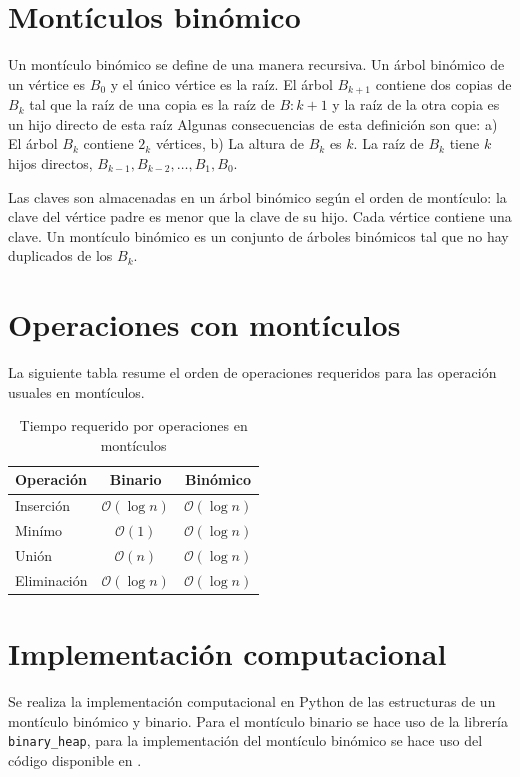 \documentclass[letterpaper,11pt]{article}
\begin{document}
\section{Montículos binómico}

Un montículo binómico se define de una manera recursiva. Un árbol binómico de un vértice es $B_0$ y el único vértice es la raíz. El árbol $B_{k+1}$ contiene dos copias de $B_k$ tal que la raíz de una copia es la raíz de $B:k+1$ y la raíz de la otra copia es un hijo directo de esta raíz Algunas consecuencias de esta definición son que: a) El árbol $B_k$ contiene $2_k$ vértices, b) La altura de $B_k$ es $k$. La raíz de $B_k$ tiene $k$ hijos directos, $B_{k-1}, B_{k-2}, \dots, B_1, B_0$.

Las claves son almacenadas en un árbol binómico según el orden de montículo: la clave del vértice padre es menor que la clave de su hijo. Cada vértice contiene una clave. Un montículo binómico es un conjunto de árboles binómicos tal que no hay duplicados de los $B_k$. \cite{Schaeffer2020} 

\section{Operaciones con montículos}

La siguiente tabla resume el orden de operaciones requeridos para las operación usuales en montículos.

\begin{table}[h!]

\centering
\begin{tabular}{l|c|c}
Operación   & Binario & Binómico \\\hline
Inserción   &  $\mathcal{O}(\log n)$      & $\mathcal{O}(\log n)$       \\
Minímo      & $\mathcal{O}(1)$       & $\mathcal{O}(\log n)$        \\
Unión       & $\mathcal{O}(n)$       & $\mathcal{O}(\log n)$       \\
Eliminación & $\mathcal{O}(\log n)$     & $\mathcal{O}(\log n)$      
\end{tabular}
\caption{Tiempo requerido por operaciones en montículos}
\label{tab:ope}
\end{table}


\section{Implementación computacional}

Se realiza la implementación computacional en Python de las estructuras de un montículo binómico y binario. Para el montículo binario se hace uso de la librería \texttt{binary\_heap}, para la implementación del montículo binómico se hace uso del código disponible en \cite{Nayuki2018}. 
\end{document}
